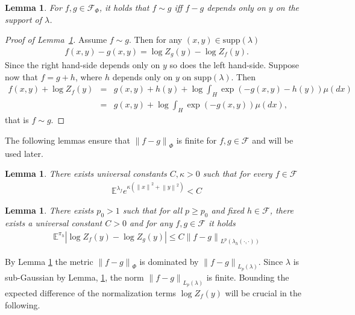 \documentclass{amsart}
\newtheorem{lemma}[theorem]{Lemma}
\theoremstyle{definition}
\newcommand{\E}{{\mathbb E}}
\newcommand{\norm}[1]{\left\|#1\right\|}
\newcommand{\F}{\mathcal{F}}
\begin{document}
\begin{lemma}\label{lem: equivalence class}
    For $f, g \in \F_\Phi$, it holds that $f \sim g$ iff $f-g$ depends only on $y$ on the support of $\lambda$.
\end{lemma}
\begin{proof}[Proof of Lemma~\ref{lem: equivalence class}]
        Assume $f\sim g$. Then for any $(x, y) \in \mathrm{supp}(\lambda)$
        \begin{eqnarray*}
            f(x, y) - g(x, y) = \log Z_g(y) - \log Z_f(y).
        \end{eqnarray*}
        Since the right hand-side depends only on $y$ so does the left hand-side. Suppose now that $f = g + h$, where $h$ depends only on $y$ on $\mathrm{supp}(\lambda)$. Then
        \begin{eqnarray*}
            f(x, y) + \log Z_f(y) &=& g(x, y) + h(y) + \log \int_H \exp(-g(x, y) - h(y)) \mu(dx) \\
            & = & g(x, y) + \log \int_H \exp(-g(x, y)) \mu(dx),
        \end{eqnarray*}
        that is $f\sim g$.
    \end{proof}

The following lemmas ensure that $\norm{f - g}_\Phi$ is finite for  $f, g \in \F$ and will be used later. 
  \begin{lemma}\label{lem: subgaussian joint}
    There exists universal constants $C, \kappa>0$ such that for every $f \in \F$
    \begin{eqnarray*}
       \E^{\lambda_f} e^{\kappa (\norm{x}^2 + \norm{y}^2)}   < C
    \end{eqnarray*}
\end{lemma}

 \begin{lemma}\label{lem: lambda bounded by Lp}
    There exists $p_0>1$ such that for all $p\ge p_0 $ and fixed $h \in \F$, there exists a universal constant $ C > 0$ and for any $f, g \in \F$ it holds
    \begin{eqnarray*}
        \E^{\pi_h} \left| \log Z_f(y) - \log Z_g(y) \right| \le C \norm{f-g}_{L^p\left(\lambda_h(\cdot, \cdot)\right)}
    \end{eqnarray*}
\end{lemma}
By Lemma \ref{lem: lambda bounded by Lp} the metric $\norm{f-g}_\Phi$ is dominated by $\norm{f-g}_{L_p(\lambda)}$. Since $\lambda$ is sub-Gaussian by Lemma, \ref{lem: subgaussian joint}, the norm $\norm{f-g}_{L_p(\lambda)}$ is finite. Bounding the expected difference of the normalization terms $\log Z_f(y)$ will be crucial in the following.
\end{document}

